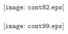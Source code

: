 \documentclass{beamer}
\begin{document}
%
%
%
\begin{frame}
	\frametitle{}

	
$$\texttt{[image: cont82.eps]}$$

\end{frame}


%
%
%
%
%
\begin{frame}
	\frametitle{}

	
$$\texttt{[image: cont99.eps]}$$

\end{frame}
\end{document}
